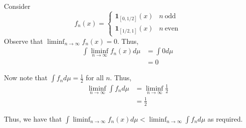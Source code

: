 \documentclass[12pt]{article}
\newenvironment{problem}[2][Problem]{\begin{trivlist}
\item[\hskip \labelsep {\bfseries #1}\hskip \labelsep {\bfseries #2.}]}{\end{trivlist}}
\begin{document}
\newpage
\begin{problem}{5}
\end{problem}

Consider $$f_n(x)=\begin{cases}\boldsymbol 1_{[0,1/2]}(x)&n\ \text{odd}\\ \boldsymbol 1_{[1/2,1]}(x)&n\ \text{even}\end{cases}$$ Observe that $\liminf_{n \to \infty} f_n(x) = 0$. Thus,
\begin{align*}
\int \liminf_{n \to \infty} f_n(x) d \mu &= \int 0 d\mu\\
&= 0
\end{align*}

Now note that $\int f_n d\mu = \frac{1}{2}$ for all $n$. Thus,
\begin{align*}
\liminf_{n \to \infty} \int f_n d\mu &= \liminf_{n \to \infty} \frac{1}{2}\\
&= \frac{1}{2}
\end{align*}

Thus, we have that $\int \liminf_{n \to \infty} f_n(x) d \mu < \liminf_{n \to \infty} \int f_n d\mu$ as required.
\end{document}
